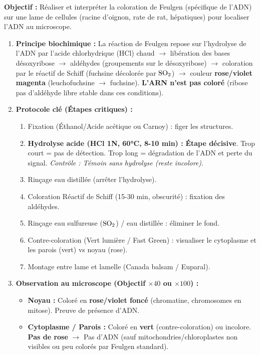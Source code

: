 \documentclass[11pt]{article}
\begin{document}
\begin{methode}
\textbf{Objectif :} Réaliser et interpréter la coloration de Feulgen (spécifique de l'ADN) sur une lame de cellules (racine d'oignon, rate de rat, hépatiques) pour localiser l'ADN au microscope.
\begin{enumerate}
    \item \textbf{Principe biochimique :} La réaction de Feulgen repose sur l'hydrolyse de l'ADN par l'acide chlorhydrique (HCl) chaud $\rightarrow$ libération des bases désoxyribose $\rightarrow$ aldéhydes (groupements  sur le désoxyribose) $\rightarrow$ coloration par le réactif de Schiff (fuchsine décolorée par $\ce{SO2}$) $\rightarrow$ couleur \textbf{rose/violet magenta} (leuchofuchsine $\rightarrow$ fuchsine). \textbf{L'ARN n'est pas coloré} (ribose pas d'aldéhyde libre stable dans ces conditions).
    \item \textbf{Protocole clé (Étapes critiques) :}
        \begin{enumerate}
            \item Fixation (Éthanol/Acide acétique ou Carnoy) : figer les structures.
            \item \textbf{Hydrolyse acide (HCl 1N, 60°C, 8-10 min) :} \textbf{Étape décisive}. Trop court = pas de détection. Trop long = dégradation de l'ADN et perte du signal. \textit{Contrôle : Témoin sans hydrolyse (reste incolore)}.
            \item Rinçage eau distillée (arrêter l'hydrolyse).
            \item Coloration Réactif de Schiff (15-30 min, obscurité) : fixation des aldéhydes.
            \item Rinçage eau sulfureuse ($\ce{SO2}$) / eau distillée : éliminer le fond.
            \item Contre-coloration (Vert lumière / Fast Green) : visualiser le cytoplasme et les parois (vert) vs noyau (rose).
            \item Montage entre lame et lamelle (Canada balsam / Euparal).
        \end{enumerate}
    \item \textbf{Observation au microscope (Objectif $\times 40$ ou $\times 100$) :}
        \begin{itemize}
            \item \textbf{Noyau :} Coloré en \textbf{rose/violet foncé} (chromatine, chromosomes en mitose). Preuve de présence d'ADN.
            \item \textbf{Cytoplasme / Parois :} Coloré en \textbf{vert} (contre-coloration) ou incolore. \textbf{Pas de rose} $\rightarrow$ Pas d'ADN (sauf mitochondries/chloroplastes non visibles ou peu colorés par Feulgen standard).

\end{itemize}
\end{enumerate}
\end{methode}
\end{document}
